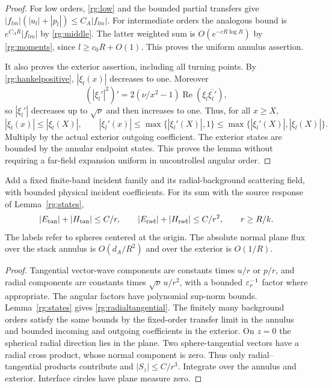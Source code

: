 \begin{proof}
For low orders, \eqref{rg:low} and the bounded partial
transfers give $|f_{lm}|(|u_l|+|p_l|)\leq C_A|f_{lm}|$.
For intermediate orders the analogous bound is
$e^{C_AR}|f_{lm}|$ by \eqref{rg:middle}.
The latter weighted sum is $O(e^{-cR\log R})$ by
\eqref{rg:moments}, since $l\geq c_0R+O(1)$.
This proves the uniform annulus assertion.

It also proves the exterior assertion, including all turning
points. By \eqref{rg:hankelpositive}, $|\xi_l(x)|$ decreases
to one. Moreover
\[
 (|\xi_l'|^2)'=
       2(\nu/x^2-1)\operatorname{Re}(\xi_l\overline{\xi_l'}),
\]
so $|\xi_l'|$ decreases up to $\sqrt\nu$ and then increases
to one. Thus, for all $x\geq X$,
\[
 |\xi_l(x)|\leq|\xi_l(X)|,\qquad
 |\xi_l'(x)|\leq\max\{|\xi_l'(X)|,1\}
              \leq\max\{|\xi_l'(X)|,|\xi_l(X)|\}.
\]
Multiply by the actual exterior outgoing coefficient.
The exterior states are bounded by the annular endpoint states.
This proves the lemma without requiring a far-field expansion
uniform in uncontrolled angular order.
\end{proof}

\begin{corollary}
\label{rg:remote}
Add a fixed finite-band incident family and its radial-background
scattering field, with bounded physical incident coefficients.
For its sum with the source response of Lemma~\ref{rg:states},
\begin{equation}\label{rg:radialtangential}
 |E_{\rm tan}|+|H_{\rm tan}|\leq C/r,\qquad
 |E_{\rm rad}|+|H_{\rm rad}|\leq C/r^2,\qquad r\geq R/k .
\end{equation}
The labels refer to spheres centered at the origin.
The absolute normal plane flux over the stack annulus is
$O(d_A/R^2)$ and over the exterior is $O(1/R)$.
\end{corollary}
\begin{proof}
Tangential vector-wave components are constants times $u/r$
or $p/r$, and radial components are constants times
$\sqrt\nu\,u/r^2$, with a bounded $\varepsilon_r^{-1}$ factor where
appropriate. The angular factors have polynomial sup-norm
bounds. Lemma~\ref{rg:states} gives \eqref{rg:radialtangential}.
The finitely many background orders satisfy the same bounds
by the fixed-order transfer limit in the annulus and bounded
incoming and outgoing coefficients in the exterior.
On $z=0$ the spherical radial direction lies in the plane.
Two sphere-tangential vectors have a radial cross product,
whose normal component is zero. Thus only radial--tangential
products contribute and $|S_z|\leq C/r^3$.
Integrate over the annulus and exterior. Interface circles
have plane measure zero.
\end{proof}

